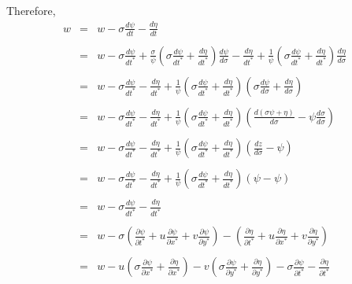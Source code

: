 \documentclass[oribibl]{llncs}
\begin{document}
Therefore, 
\begin{eqnarray}  
w &=& w - \sigma \frac{d\psi}{dt} - \frac{d \eta}{d t} \nonumber \\ \nonumber \\
    &=& w - \sigma \frac{d\psi}{dt^*} +\frac{\sigma}{\psi}  \left( \sigma \frac{d\psi}{dt^*} +\frac{d \eta}{dt^*} \right) \frac{d \psi}{d \sigma}  - \frac{d\eta}{dt^*}  +\frac{1}{\psi} \left( \sigma \frac{d\psi}{dt^*} +\frac{d \eta}{dt^*} \right) \frac{d \eta}{d \sigma} \nonumber \\ \nonumber \\
    &=& w - \sigma \frac{d\psi}{dt^*} - \frac{d \eta}{d t^*}+  \frac{1}{\psi} \left( \sigma \frac{d\psi}{dt^*} +\frac{d \eta}{dt^*} \right)  \left( \sigma \frac{d\psi}{d\sigma} + \frac{d\eta}{d\sigma}\right)\nonumber \\ \nonumber \\
     &=& w - \sigma \frac{d\psi}{dt^*} - \frac{d \eta}{d t^*}+  \frac{1}{\psi} \left( \sigma \frac{d\psi}{dt^*} +\frac{d \eta}{dt^*} \right)  \left(\frac{d (\sigma \psi+\eta)}{d\sigma} -\psi \frac{d\sigma}{d\sigma}\right)\nonumber \\ \nonumber \\
     &=& w - \sigma \frac{d\psi}{dt^*} - \frac{d \eta}{d t^*}+  \frac{1}{\psi} \left( \sigma \frac{d\psi}{dt^*} +\frac{d \eta}{dt^*} \right)  \left(\frac{dz}{d\sigma} -\psi \right)\nonumber \\ \nonumber \\
     &=& w - \sigma \frac{d\psi}{dt^*} - \frac{d \eta}{d t^*}+  \frac{1}{\psi} \left( \sigma \frac{d\psi}{dt^*} +\frac{d \eta}{dt^*} \right)  \left(\psi -\psi \right)\nonumber \\ \nonumber \\     
     &=& w - \sigma \frac{d\psi}{dt^*} - \frac{d \eta}{d t^*} \nonumber \\ \nonumber \\  
     &=& w - \sigma \left( \frac{\partial \psi}{\partial t^*} + u\frac{\partial \psi}{\partial x^*}+v\frac{\partial \psi}{\partial y^*} \right) -\left( \frac{\partial \eta}{\partial t^*} + u\frac{\partial \eta}{\partial x^*}+v\frac{\partial \eta}{\partial y^*} \right) \nonumber \\ \nonumber \\  
     &=& w -  u\left( \sigma\frac{\partial \psi}{\partial x^*} +\frac{\partial \eta}{\partial x^*} \right) -v \left(\sigma \frac{\partial \psi}{\partial y^*}+\frac{\partial \eta}{\partial y^*} \right) -\sigma \frac{\partial \psi}{\partial t^*} - \frac{\partial \eta}{\partial t^*}
\end{eqnarray}  
\end{document}
